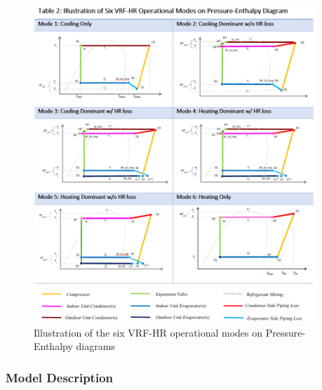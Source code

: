 \begin{figure}[hbtp] %
\centering
\includegraphics[width=0.95\textwidth, keepaspectratio=true]{media/VRF-HR-Chart-EnthalpyPressure.png}
\caption{Illustration of the six VRF-HR operational modes on Pressure-Enthalpy diagrams \label{fig:VRF-HR-Chart-EnthalpyPressure}}
\end{figure}


\subsubsection{Model Description}\label{vrf-heat-pump-model-description-2016-07-20-09-10}

